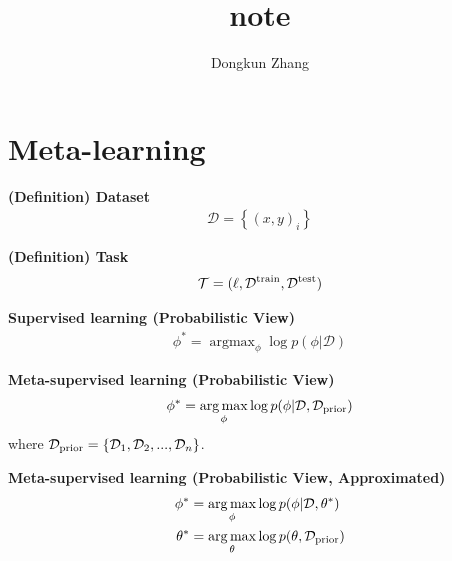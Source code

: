 
\usepackage[utf8]{inputenc}



\title{note}
\author{Dongkun Zhang}



\maketitle

\section{Meta-learning}



\begin{tcolorbox}
\textbf{
    (Definition) Dataset
} 
\begin{align*}
    \mathcal{D} = \left\{ (x,y)_i \right\}
\end{align*}
\end{tcolorbox}


\begin{tcolorbox}
\textbf{
    (Definition) Task
} 
\begin{align*}
    \mathcal{T} = (\ell, \mathcal{D}^{{\rm train}}, \mathcal{D}^{{\rm test}})
\end{align*}
\end{tcolorbox}



\begin{tcolorbox}
\textbf{
    Supervised learning (Probabilistic View)
} 
\begin{align*}
    \phi^{*} = \mathop{\arg\max}_{\phi}\log p(\phi | \mathcal{D})
\end{align*}
\end{tcolorbox}


\begin{tcolorbox}
\textbf{
    Meta-supervised learning (Probabilistic View)
} 
\begin{align*}
    \phi^{*} = \mathop{\arg\max}_{\phi}\log p(\phi | \mathcal{D}, \mathcal{D}_{{\rm prior}})
\end{align*}
where $\mathcal{D}_{{\rm prior}} = \left\{ \mathcal{D}_1, \mathcal{D}_2, ..., \mathcal{D}_n \right\}$.
\end{tcolorbox}

\begin{tcolorbox}
\textbf{
    Meta-supervised learning (Probabilistic View, Approximated)
}
\begin{align*}
    \phi^{*} &= \mathop{\arg\max}_{\phi}\log p(\phi | \mathcal{D}, \theta^{*}) \\
    \theta^{*} &= \mathop{\arg\max}_{\theta}\log p(\theta, \mathcal{D}_{{\rm prior}})
\end{align*}
\end{tcolorbox}



